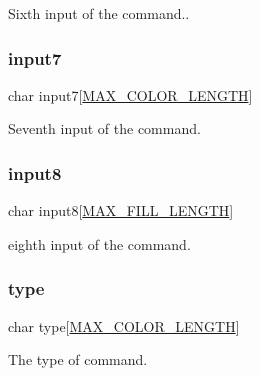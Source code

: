 Sixth input of the command.. \mbox{\label{struct_l_l_1_1command__t_a5ad42f7fce183b561e059e686aea6fbf}} 
\subsubsection{\texorpdfstring{input7}{input7}}
{\footnotesize\ttfamily char input7\mbox{[}\mbox{\hyperlink{group___global_ga9db5737c1a3aca5e334701167cae3e00}{M\+A\+X\+\_\+\+C\+O\+L\+O\+R\+\_\+\+L\+E\+N\+G\+TH}}\mbox{]}}

Seventh input of the command. \mbox{\label{struct_l_l_1_1command__t_a11423f31c7aca444bf9639374decd9bc}} 
\subsubsection{\texorpdfstring{input8}{input8}}
{\footnotesize\ttfamily char input8\mbox{[}\mbox{\hyperlink{group___global_ga2543b47347236bd1d0a2428cb40cc321}{M\+A\+X\+\_\+\+F\+I\+L\+L\+\_\+\+L\+E\+N\+G\+TH}}\mbox{]}}

eighth input of the command. \mbox{\label{struct_l_l_1_1command__t_ad4885d875d90def63ae565800ef3a1f1}} 
\subsubsection{\texorpdfstring{type}{type}}
{\footnotesize\ttfamily char type\mbox{[}\mbox{\hyperlink{group___global_ga9db5737c1a3aca5e334701167cae3e00}{M\+A\+X\+\_\+\+C\+O\+L\+O\+R\+\_\+\+L\+E\+N\+G\+TH}}\mbox{]}}

The type of command. 